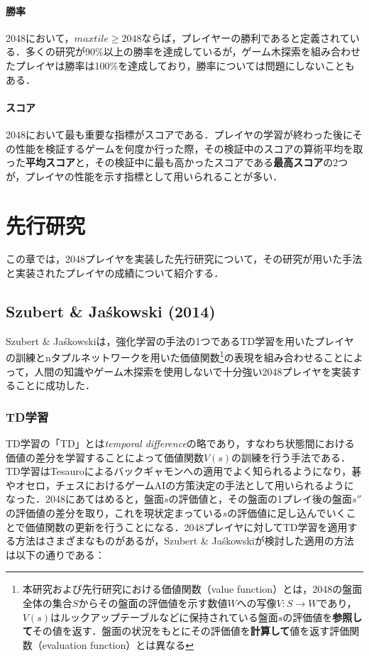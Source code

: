\documentclass{suribt}
\begin{document}
\subsubsection{勝率}
2048において，$max tile \geq 2048$ならば，プレイヤーの勝利であると定義されている．多くの研究が90\%以上の勝率を達成しているが，ゲーム木探索を組み合わせたプレイヤは勝率は100\%を達成しており，勝率については問題にしないこともある．

\subsubsection{スコア}
2048において最も重要な指標がスコアである．プレイヤの学習が終わった後にその性能を検証するゲームを何度か行った際，その検証中のスコアの算術平均を取った\textbf{平均スコア}と，その検証中に最も高かったスコアである\textbf{最高スコア}の2つが，プレイヤの性能を示す指標として用いられることが多い．

\chapter{先行研究}
この章では，2048プレイヤを実装した先行研究について，その研究が用いた手法と実装されたプレイヤの成績について紹介する．

\section{Szubert \& Ja\'{s}kowski (2014)}
Szubert \& Ja\'{s}kowskiは，強化学習の手法の1つであるTD学習を用いたプレイヤの訓練とnタプルネットワークを用いた価値関数\footnote{本研究および先行研究における価値関数（value function）とは，2048の盤面全体の集合$S$からその盤面の評価値を示す数値$W$への写像$V: S \rightarrow W$であり，$V(s)$はルックアップテーブルなどに保持されている盤面$s$の評価値を\textbf{参照して}その値を返す．盤面の状況をもとにその評価値を\textbf{計算して}値を返す評価関数（evaluation function）とは異なる}の表現を組み合わせることによって，人間の知識やゲーム木探索を使用しないで十分強い2048プレイヤを実装することに成功した．

\subsection{TD学習}
TD学習の「TD」とは\emph{temporal difference}の略であり，すなわち状態間における価値の差分を学習することによって価値関数$V(s)$の訓練を行う手法である．TD学習はTesauroによるバックギャモンへの適用\cite{Tesauro}でよく知られるようになり，碁\cite{Runarsson}\cite{Schraudolph}やオセロ\cite{Dries}\cite{SzubertOthello}，チェス\cite{Baxter}におけるゲームAIの方策決定の手法として用いられるようになった．2048にあてはめると，盤面$s$の評価値と，その盤面の1プレイ後の盤面$s''$の評価値の差分を取り，これを現状定まっている$s$の評価値に足し込んでいくことで価値関数の更新を行うことになる．2048プレイヤに対してTD学習を適用する方法はさまざまなものがあるが，Szubert \& Ja\'{s}kowskiが検討した適用の方法は以下の通りである：
\end{document}
